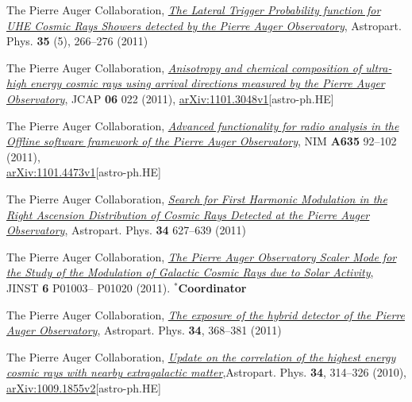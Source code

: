 \documentclass[11pt, a4paper]{article}
\newcommand{\years}[1]{\marginnote{\scriptsize #1}}
\begin{document}
\begin{etaremune}
\item \years{2011}The Pierre Auger Collaboration, 
\href{http://dx.doi.org/10.1016/j.astropartphys.2011.08.001}{\emph{The Lateral
Trigger Probability function for UHE Cosmic Rays Showers detected by the Pierre
Auger Observatory}}, Astropart. Phys. {\bf{35}} (5), 266--276 (2011)

\item \years{2011}The Pierre Auger Collaboration,
\href{http://dx.doi.org/10.1088/1475-7516/2011/06/022}{\emph{Anisotropy and
chemical composition of ultra-high energy cosmic rays using arrival directions
measured by the Pierre Auger Observatory}}, JCAP {\bf 06} 022 (2011),
\href{http://arxiv.org/abs/1106.3048}{arXiv:1101.3048v1}[astro-ph.HE]

\item \years{2011}The Pierre Auger Collaboration,
\href{http://dx.doi.org/10.1016/j.nima.2011.01.049}{{\emph{Advanced
functionality for radio analysis in the Offline software framework of the
Pierre Auger Observatory}}}, NIM {\bf A635} 92--102
(2011),\\
\href{http://arxiv.org/abs/1101.4473}{arXiv:1101.4473v1}[astro-ph.HE]

\item \years{2011}The Pierre Auger Collaboration,
\href{http://dx.doi.org/10.1016/j.astropartphys.2010.12.007}{\emph{Search for
First Harmonic Modulation in the Right Ascension Distribution of Cosmic Rays
Detected at the Pierre Auger Observatory}}, Astropart. Phys. {\bf 34} 627--639
(2011)

\item \years{2011}The Pierre Auger Collaboration,
\href{http://dx.doi.org/10.1088/1748-0221/6/01/P01003}{\emph{The Pierre Auger
Observatory Scaler Mode for the Study of the Modulation of Galactic Cosmic Rays
due to Solar Activity}}, JINST {\bf 6} P01003--
P01020 (2011). $^*${\bf{Coordinator}}

\item \years{2010}The Pierre Auger Collaboration,
\href{http://dx.doi.org/10.1016/j.astropartphys.2010.10.001}{\emph{The exposure
of the hybrid detector of the Pierre Auger Observatory}}, Astropart. Phys. {\bf
34}, 368--381 (2011)

\item \years{2010}The Pierre Auger Collaboration,
\href{http://dx.doi.org/10.1016/j.astropartphys.2010.08.010}{\emph{Update on
the correlation of the highest energy cosmic rays with nearby extragalactic
matter}},Astropart. Phys. {\bf 34}, 314--326 (2010),
\href{http://arxiv.org/abs/1009.1855}{arXiv:1009.1855v2}[astro-ph.HE]


\end{etaremune}
\end{document}
